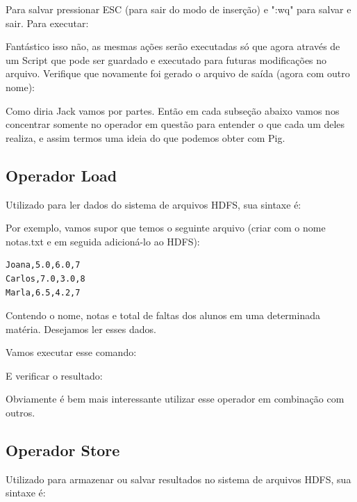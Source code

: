 \documentclass[a4paper,11pt]{article}
\begin{document}
Para salvar pressionar ESC (para sair do modo de inserção) e ":wq" para salvar e sair. Para executar: \\

Fantástico isso não, as mesmas ações serão executadas só que agora através de um Script que pode ser guardado e executado para futuras modificações no arquivo. Verifique que novamente foi gerado o arquivo de saída (agora com outro nome): \\

Como diria Jack vamos por partes. Então em cada subseção abaixo vamos nos concentrar somente no operador em questão para entender o que cada um deles realiza, e assim termos uma ideia do que podemos obter com Pig.

\subsection{Operador Load}
Utilizado para ler dados do sistema de arquivos HDFS, sua sintaxe é: \\

Por exemplo, vamos supor que temos o seguinte arquivo (criar com o nome notas.txt e em seguida adicioná-lo ao HDFS):
\begin{lstlisting}[]
Joana,5.0,6.0,7
Carlos,7.0,3.0,8
Marla,6.5,4.2,7
\end{lstlisting}

Contendo o nome, notas e total de faltas dos alunos em uma determinada matéria. Desejamos ler esses dados. \\

Vamos executar esse comando: \\

E verificar o resultado: \\

Obviamente é bem mais interessante utilizar esse operador em combinação com outros.

\subsection{Operador Store}
Utilizado para armazenar ou salvar resultados no sistema de arquivos HDFS, sua sintaxe é: \\
\end{document}
